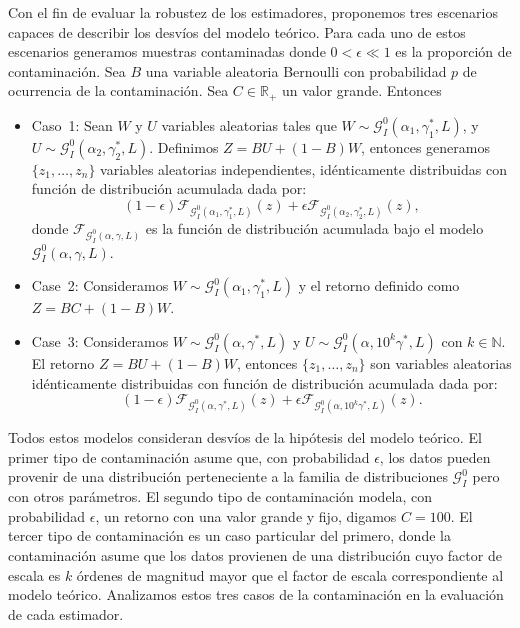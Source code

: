 Con el fin de evaluar la robustez de los estimadores, proponemos tres escenarios capaces de describir los desvíos del modelo teórico. Para cada uno de estos escenarios generamos muestras contaminadas donde $0<\epsilon \ll 1$ es la proporción de contaminación. 
Sea  $B$ una variable aleatoria Bernoulli con probabilidad $p$ de ocurrencia de la contaminación. Sea $C \in \mathbb R_+$ un valor grande. Entonces
\begin{itemize}
	\item \label{Caso1}Caso~1:
	Sean $W$ y $U$ variables aleatorias tales que $W \sim \mathcal{G}_I^0(\alpha_1,\gamma_1^*,L)$, y $U \sim \mathcal{G}_I^0(\alpha_2,\gamma_2^*,L) $. Definimos $Z=BU+(1-B)W$, entonces generamos $\{z_1,\dots,z_n\}$ variables aleatorias independientes, idénticamente distribuidas con función de distribución acumulada dada por:
	$$
	(1-\epsilon) \mathcal{F}_{\mathcal{G}_I^0(\alpha_1,\gamma_1^*,L)}(z)+\epsilon\mathcal{F}_{\mathcal{G}_I^0(\alpha_2,\gamma_2^*,L)}(z),
	$$
	donde $\mathcal{F}_{\mathcal{G}_I^0(\alpha,\gamma,L)}$ es la función de distribución acumulada bajo el modelo $\mathcal{G}_I^0(\alpha,\gamma,L)$.
	\item \label{Caso2}Case~2: Consideramos $W \sim \mathcal{G}_I^0(\alpha_1,\gamma_1^*,L)$ y el retorno definido como $Z=BC+(1-B)W$.
	\item \label{Caso3}Case~3:
	Consideramos $W \sim \mathcal{G}_I^0(\alpha,\gamma^*,L)$ y $U\sim \mathcal{G}_I^0(\alpha,10^k\gamma^*,L) $ con $k \in \mathbb{N}$. 
	El retorno $Z=BU+(1-B)W$, entonces $\{z_1,\dots,z_n\}$ son variables aleatorias idénticamente distribuidas con función de distribución acumulada dada por: 
	$$
	(1-\epsilon) \mathcal{F}_{\mathcal{G}_I^0(\alpha,\gamma^*,L)}(z)+\epsilon\mathcal{F}_{\mathcal{G}_I^0(\alpha,10^k\gamma^*,L)}(z).
	$$
\end{itemize}

Todos estos modelos consideran desvíos de la hipótesis del modelo teórico. El primer tipo de contaminación asume que, con probabilidad $\epsilon$, los datos pueden provenir de una distribución perteneciente a la familia de distribuciones $\mathcal{G}_I^0$ pero con otros parámetros. El segundo tipo de contaminación modela, con probabilidad $\epsilon$, un retorno con una valor grande y fijo, digamos $C=100$. El tercer tipo de contaminación es un caso particular del primero, donde la contaminación asume que los datos provienen de una distribución cuyo factor de escala es $k$ órdenes de magnitud mayor que el factor de escala correspondiente al modelo teórico. Analizamos estos tres casos de la contaminación en la evaluación de cada estimador.

